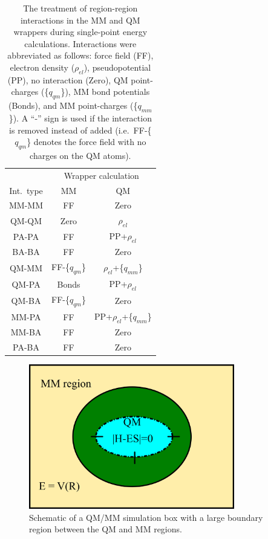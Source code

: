 \documentclass[12pt]{report}
\begin{document}
\begin{table}[hbt]
 \centering
 \begin{tabular}{|c|c c|}
 \hline
  & \multicolumn{2}{|c|}{Wrapper calculation} \\
 Int.\ type & MM & QM \\ \hline
 MM-MM & FF & Zero \\
 QM-QM & Zero & $\rho_{el}$ \\
 PA-PA & FF & PP+$\rho_{el}$ \\
 BA-BA & FF & Zero \\
 QM-MM & FF-\{$q_{qm}$\} & $\rho_{el}$+\{$q_{mm}$\} \\
 QM-PA & Bonds & PP+$\rho_{el}$ \\
 QM-BA & FF-\{$q_{qm}$\} & Zero \\
 MM-PA & FF & PP+$\rho_{el}$+\{$q_{mm}$\} \\
 MM-BA & FF & Zero \\
 PA-BA & FF & Zero \\ \hline
 \end{tabular}
 \caption{
 The treatment of region-region interactions in the MM and QM
 wrappers during single-point energy calculations.
 Interactions were abbreviated as follows: force field (FF), electron density
 ($\rho_{el}$), pseudopotential (PP), no interaction (Zero), QM point-charges
 (\{$q_{qm}$\}), MM bond potentials (Bonds), and MM point-charges
 (\{$q_{mm}$\}).
 A ``-'' sign is used if the interaction is removed instead of added
 (i.e.\ FF-\{$q_{qm}$\} denotes the force field with no charges on the
 QM atoms).}
 \label{tab:IntTable}
\end{table}

\begin{figure}[hbt]
 \centering
 \includegraphics[width=0.8\textwidth]{../doc/images/QMMM_3.png}
 \caption{
 Schematic of a QM/MM simulation box with a large boundary region
 between the QM and MM regions.}
 \label{fig:QMMM3}
\end{figure}
\end{document}

